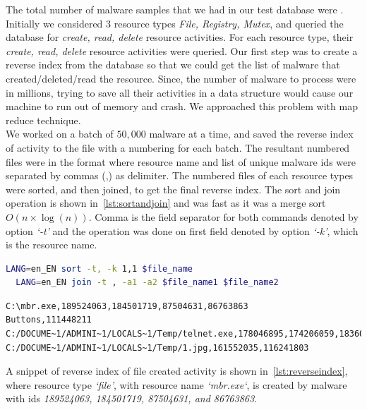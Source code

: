 The total number of malware samples that we had in our test database were \textbf{\gettotalmalwarei{}}.
Initially we considered 3 resource types \textit{File, Registry, Mutex}, and queried the database for \textit{create, read, delete} resource activities.
For each resource type, their \textit{create, read, delete} resource activities were queried.
Our first step was to create a reverse index from the database so that we could get the list of malware that created/deleted/read the resource.
Since, the number of malware to process were in millions, trying to save all their activities in a data structure would cause our machine to run out of memory and crash.
We approached this problem with map reduce technique.\\

We worked on a batch of $50,000$ malware at a time, and saved the reverse index of activity to the file with a numbering for each batch.
The resultant numbered files were in the format where resource name and list of unique malware ids were separated by commas (,) as delimiter.
The numbered files of each resource types were sorted, and then joined, to get the final reverse index.
The sort and join operation is shown in~\autoref{lst:sortandjoin} and was fast as it was a merge sort $O( n \times \log(n))$.
Comma is the field separator for both commands denoted by option \emph{`-t'}  and the operation was done on first field denoted by option \emph{`-k'}, which is the resource name.\\

\begin{lstlisting}[numbers=none,language=bash,caption={Sort and join the reverse index},label={lst:sortandjoin}]
  LANG=en_EN sort -t, -k 1,1 $file_name
  LANG=en_EN join -t , -a1 -a2 $file_name1 $file_name2
\end{lstlisting}

\begin{lstlisting}[numbers=none,caption={Sample of reverse index created for File activity},label={lst:reverseindex}]
C:\mbr.exe,189524063,184501719,87504631,86763863
Buttons,111448211
C:/DOCUME~1/ADMINI~1/LOCALS~1/Temp/telnet.exe,178046895,174206059,183601891,89650247
C:/DOCUME~1/ADMINI~1/LOCALS~1/Temp/1.jpg,161552035,116241803
\end{lstlisting}

A snippet of reverse index of file created activity is shown in~\autoref{lst:reverseindex}, where resource type \emph{`file'}, with resource name \emph{`mbr.exe`}, is created by malware with ids \emph{189524063, 184501719, 87504631, and 86763863}.

